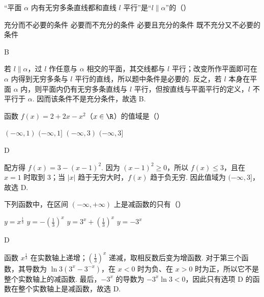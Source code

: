 \begin{problem}
“平面 \(\alpha\) 内有无穷多条直线都和直线 \(l\) 平行”是“\(l \parallel \alpha\)”的（\quad）

\choices
    {充分而不必要的条件}
    {必要而不充分的条件}
    {必要且充分的条件}
    {既不充分又不必要的条件}
\end{problem}

\begin{answer}
B
\end{answer}

\begin{solution}
若 \(l\parallel\alpha\)，过 \(l\) 作任意与 \(\alpha\) 相交的平面，其交线都与 \(l\) 平行；改变所作平面即可在 \(\alpha\) 内得到无穷多条与 \(l\) 平行的直线，所以题中条件是必要的. 反之，若 \(l\) 本身在平面 \(\alpha\) 内，则平面内仍有无穷多条直线与 \(l\) 平行，但按直线与平面平行的定义，\(l\) 不平行于 \(\alpha\). 因而该条件不是充分条件，故选 B.
\end{solution}

\begin{problem}
函数 \(f(x) = 2 + 2x - x^2\)（\(x \in \R\)）的值域是（\quad）

\choices
    {\((-\infty,1)\)}
    {\((-\infty,1]\)}
    {\((-\infty,3)\)}
    {\((-\infty,3]\)}
\end{problem}

\begin{answer}
D
\end{answer}

\begin{solution}
配方得 \(f(x)=3-(x-1)^2\). 因为 \((x-1)^2\geqslant0\)，所以 \(f(x)\leqslant3\)，且在 \(x=1\) 时取到 3；当 \(|x|\) 趋于无穷大时，\(f(x)\) 趋于负无穷. 因此值域为 \((-\infty,3]\)，故选 D.
\end{solution}

\begin{problem}
下列函数中，在区间 \((-\infty,+\infty)\) 上是减函数的只有（\quad）

\choices
    {\(y = x^{\frac{1}{3}}\)}
    {\(y = -\left(\frac{1}{3}\right)^x\)}
    {\(y = 3^x + \left(\frac{1}{3}\right)^x\)}
    {\(y = -3^x\)}
\end{problem}

\begin{answer}
D
\end{answer}

\begin{solution}
函数 \(x^{\frac{1}{3}}\) 在实数轴上递增；\(\left(\frac13\right)^x\) 递减，取相反数后变为增函数. 对于第三个函数，其导数为 \(\ln3\left(3^x-3^{-x}\right)\)，在 \(x<0\) 时为负、在 \(x>0\) 时为正，所以它不是整个实数轴上的减函数. 最后，\(-3^x\) 的导数为 \(-3^x\ln3<0\)，因此只有选项 D 的函数在整个实数轴上是减函数，故选 D.
\end{solution}

